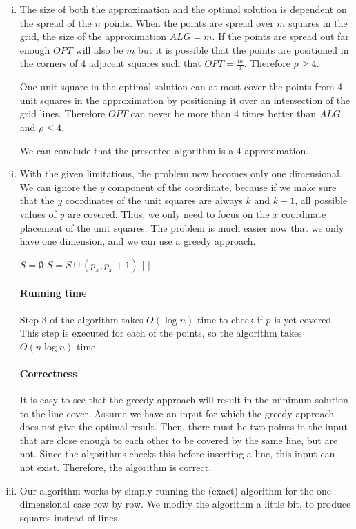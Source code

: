 \begin{enumerate}[(i)]
	\item The size of both the approximation and the optimal solution is dependent on the spread of the $n$ points. When the points are spread over $m$ squares in the grid, the size of the approximation $ALG = m$. If the points are spread out far enough $OPT$ will also be $m$ but it is possible that the points are positioned in the corners of 4 adjacent squares such that $OPT = \frac{m}{4}$. Therefore $\rho \geq 4$.

One unit square in the optimal solution can at most cover the points from 4 unit squares in the approximation by positioning it over an intersection of the grid lines. Therefore $OPT$ can never be more than 4 times better than $ALG$ and $\rho \leq 4$.

We can conclude that the presented algorithm is a 4-approximation.
	\item With the given limitations, the problem now becomes only one dimensional.
		We can ignore the $y$ component of the coordinate, because if we make sure that the $y$ coordinates of the unit squares are always $k$ and $k+1$, all possible values of $y$ are covered.
		Thus, we only need to focus on the $x$ coordinate placement of the unit squares.
		The problem is much easier now that we only have one dimension, and we can use a greedy approach.

\begin{sourcecode}
$S = \emptyset$
 
	 
		$S = S \cup (p_x, p_x + 1)$
	|
|
\qend
\end{sourcecode}
		\paragraph{Running time} Step 3 of the algorithm takes $O(\log{n})$ time to check if $p$ is yet covered.
			This step is executed for each of the points, so the algorithm takes $O(n \log{n})$ time.

		\paragraph{Correctness} It is easy to see that the greedy approach will result in the minimum solution to the line cover.
			Assume we have an input for which the greedy approach does not give the optimal result.
			Then, there must be two points in the input that are close enough to each other to be covered by the same line, but are not.
			Since the algorithms checks this before inserting a line, this input can not exist.
			Therefore, the algorithm is correct.
	\item Our algorithm works by simply running the (exact) algorithm for the one dimensional case row by row.
		We modify the algorithm a little bit, to produce squares instead of lines.


\end{enumerate}
